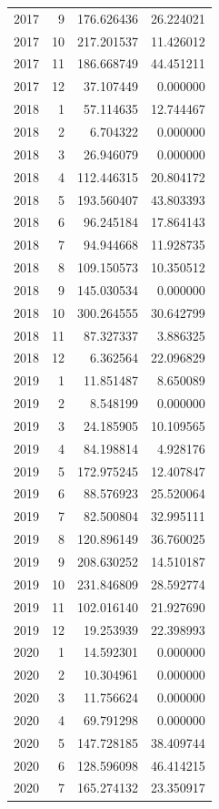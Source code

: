 \begin{tabular}{rrrr}
2017 & 9 & 176.626436 & 26.224021 \\
2017 & 10 & 217.201537 & 11.426012 \\
2017 & 11 & 186.668749 & 44.451211 \\
2017 & 12 & 37.107449 & 0.000000 \\
2018 & 1 & 57.114635 & 12.744467 \\
2018 & 2 & 6.704322 & 0.000000 \\
2018 & 3 & 26.946079 & 0.000000 \\
2018 & 4 & 112.446315 & 20.804172 \\
2018 & 5 & 193.560407 & 43.803393 \\
2018 & 6 & 96.245184 & 17.864143 \\
2018 & 7 & 94.944668 & 11.928735 \\
2018 & 8 & 109.150573 & 10.350512 \\
2018 & 9 & 145.030534 & 0.000000 \\
2018 & 10 & 300.264555 & 30.642799 \\
2018 & 11 & 87.327337 & 3.886325 \\
2018 & 12 & 6.362564 & 22.096829 \\
2019 & 1 & 11.851487 & 8.650089 \\
2019 & 2 & 8.548199 & 0.000000 \\
2019 & 3 & 24.185905 & 10.109565 \\
2019 & 4 & 84.198814 & 4.928176 \\
2019 & 5 & 172.975245 & 12.407847 \\
2019 & 6 & 88.576923 & 25.520064 \\
2019 & 7 & 82.500804 & 32.995111 \\
2019 & 8 & 120.896149 & 36.760025 \\
2019 & 9 & 208.630252 & 14.510187 \\
2019 & 10 & 231.846809 & 28.592774 \\
2019 & 11 & 102.016140 & 21.927690 \\
2019 & 12 & 19.253939 & 22.398993 \\
2020 & 1 & 14.592301 & 0.000000 \\
2020 & 2 & 10.304961 & 0.000000 \\
2020 & 3 & 11.756624 & 0.000000 \\
2020 & 4 & 69.791298 & 0.000000 \\
2020 & 5 & 147.728185 & 38.409744 \\
2020 & 6 & 128.596098 & 46.414215 \\
2020 & 7 & 165.274132 & 23.350917 \\

\end{tabular}

